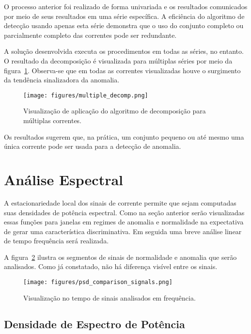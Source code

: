 O processo anterior foi realizado de forma univariada e os resultados
comunicados por meio de seus resultados em uma série específica. A eficiência
do algoritmo de detecção usando apenas esta série demonstra que o uso do
conjunto completo ou parcialmente completo das correntes pode ser redundante.

A solução desenvolvida executa os procedimentos em todas as séries, no entanto.
O resultado da decomposição é visualizada para múltiplas séries por meio da
figura~\ref{fig:multiple_decomp}. Observa-se que em todas as correntes
visualizadas houve o surgimento da tendência sinalizadora da anomalia.

\begin{figure}[H]
    \centering
    \texttt{[image: figures/multiple\_decomp.png]}
    \caption{Visualização de aplicação do algoritmo de decomposição para
    múltiplas correntes.}
    \label{fig:multiple_decomp}
\end{figure}

Os resultados sugerem que, na prática, um conjunto pequeno ou até mesmo uma
única corrente pode ser usada para a detecção de anomalia.

\section{Análise Espectral}\label{sec:spectral}

A estacionariedade local dos sinais de corrente permite que sejam computadas
suas densidades de potência espectral. Como na seção anterior serão
visualizadas essas funções para janelas em regimes de anomalia e normalidade na
expectativa de gerar uma característica discriminativa. Em seguida uma breve
análise linear de tempo frequência será realizada.

A figura~\ref{fig:psd_signals} ilustra os segmentos de sinais de normalidade e
anomalia que serão analisados. Como já constatado, não há diferença visível
entre os sinais.

\begin{figure}[H]
    \centering
    \texttt{[image: figures/psd\_comparison\_signals.png]}
    \caption{Visualização no tempo de sinais analisados em frequência.}
    \label{fig:psd_signals}
\end{figure}

\subsection{Densidade de Espectro de Potência}

